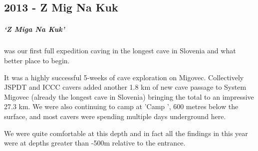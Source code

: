 \begin{tcolorbox}
	\chapter{2013 - Z Mig Na Kuk}
	\paragraph{‘Z Miga Na Kuk’} was our first full expedition caving in the longest cave in Slovenia and what better place to begin. 

It was a highly successful 5-weeks of cave exploration on Migovec. Collectively JSPDT and ICCC cavers added another 1.8 km of new cave passage to System Migovec (already the longest cave in Slovenia) bringing the total to an impressive 27.3 km. We were also continuing to camp at 'Camp \protect{}', 600 metres below the surface, and most cavers were spending multiple days underground here. 

We were quite comfortable at this depth and in fact all the findings in  this year were at depths greater than -500m relative to the entrance.
	
\end{tcolorbox}
\BgThispage
